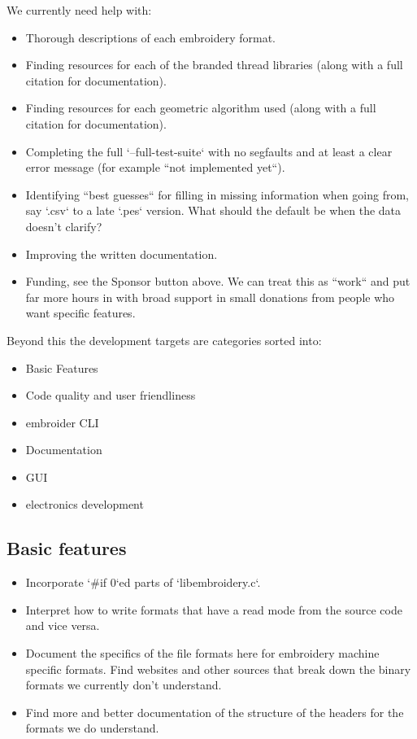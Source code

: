 \documentclass{report}
\begin{document}
We currently need help with:

\begin{itemize}
\item Thorough descriptions of each embroidery format.
\item Finding resources for each of the branded thread libraries (along with a full citation for documentation).
\item Finding resources for each geometric algorithm used (along with a full citation for documentation).
\item Completing the full `--full-test-suite`  with no segfaults and at least a clear error message (for example ``not implemented yet``).
\item Identifying ``best guesses`` for filling in missing information when going from, say `.csv` to a late `.pes` version. What should the default be when the data doesn't clarify?
\item Improving the written documentation.
\item Funding, see the Sponsor button above. We can treat this as ``work`` and put far more hours in with broad support in small donations from people who want specific features.
\end{itemize}

Beyond this the development targets are categories sorted into:

\begin{itemize}
\item Basic Features
\item Code quality and user friendliness
\item embroider CLI
\item Documentation
\item GUI
\item electronics development
\end{itemize}

\subsection{Basic features}

\begin{itemize}
\item Incorporate `\#if 0`ed parts of `libembroidery.c`.
\item Interpret how to write formats that have a read mode from the source code and vice versa.
\item Document the specifics of the file formats here for embroidery machine specific formats. Find websites and other sources that break down the binary formats we currently don't understand.
\item Find more and better documentation of the structure of the headers for the formats we do understand.
\end{itemize}
\end{document}
